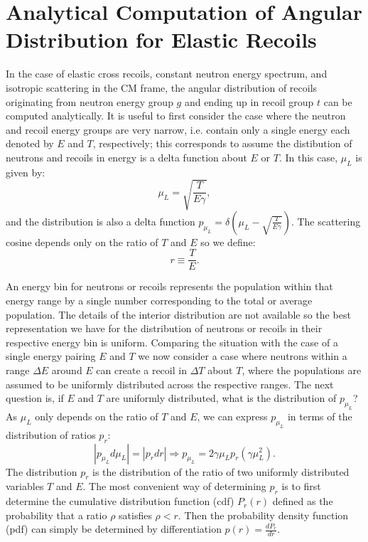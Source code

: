 \documentclass[review]{elsarticle}
\begin{document}
\section{Analytical Computation of Angular Distribution for Elastic Recoils}\label{sec:analytical_muL}
In the case of elastic cross recoils, constant neutron energy spectrum, and isotropic scattering in the CM frame, the angular distribution of recoils originating from neutron energy group $g$ and ending up in recoil group $t$ can  be computed analytically. It is useful to first consider the case where the neutron and recoil energy groups are very narrow, i.e. contain only a single energy each denoted by $E$ and $T$, respectively; this corresponds to assume the distibution of neutrons and recoils in energy is a delta function about $E$ or $T$. In this case, $\mu_L$ is given by:
\begin{equation}
  \mu_L = \sqrt{\frac{T}{E \gamma}},
\end{equation} 
and the distribution is also a delta function $p_{\mu_L} = \delta \left(\mu_L - \sqrt{\frac{T}{E \gamma}} \right)$. The scattering cosine depends only on the ratio of $T$ and $E$ so we define:
\begin{equation}
  r   \equiv \frac{T}{E}.
\end{equation}

An energy bin for neutrons or recoils represents the population within that energy range by a single number corresponding to the total or average population. The details of the interior distribution are not available so the best representation we have for the distribution of neutrons or recoils in their respective energy bin is uniform. Comparing the situation with the case of a single energy pairing $E$ and $T$ we now consider a case where neutrons within a range $\Delta E$ around $E$ can create a recoil in $\Delta T$ about $T$, where the populations are assumed to be uniformly distributed across the respective ranges. The next question is, if $E$ and $T$ are uniformly distributed, what is the distribution of $p_{\mu_L}$? As $\mu_L$ only depends on the ratio of $T$ and $E$, we can express $p_{\mu_L}$ in terms of the distribution of ratios $p_r$:
\begin{equation} \label{eq:pdf_conversion}
   | p_{\mu_L} d \mu_L | =   | p_{r} d r | \Rightarrow p_{\mu_L}  = 2 \gamma \mu_L p_r(\gamma \mu_L^2).
\end{equation}
The distribution $p_r$ is the distribution of the ratio of two uniformly distributed variables $T$ and $E$. The most convenient way of determining $p_r$ is to first 
determine the cumulative distribution function (cdf) $P_r(r)$ defined as the probability that a ratio $\rho$ satisfies $\rho < r$. Then the probability density function (pdf) can simply be 
determined by differentiation $p(r) = \frac{d P_r}{d r}$. 
\end{document}
